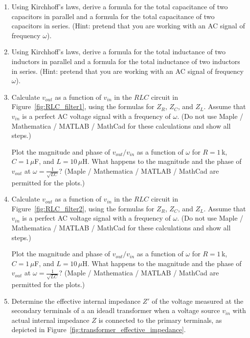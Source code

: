 \documentclass{article}
\begin{document}
\begin{enumerate}
\item Using Kirchhoff's laws, derive a formula for the total capacitance of two capacitors in parallel and a formula for the total capacitance of two capacitors in series. (Hint: pretend that you are working with an AC signal of frequency $\omega$).
\item Using Kirchhoff's laws, derive a formula for the total inductance of two inductors in parallel and a formula for the total inductance of two inductors in series. (Hint: pretend that you are working with an AC signal of frequency $\omega$).
\item Calculate $v_{out}$ as a function of $v_{in}$ in the $RLC$ circuit in Figure~\ref{fig:RLC_filter1}, using the formulas for $Z_R$, $Z_C$, and $Z_L$. Assume that $v_{in}$ is a perfect AC voltage signal with a frequency of $\omega$.  (Do not use Maple / Mathematica / MATLAB / MathCad for these calculations and show all steps.)

Plot the magnitude and phase\footnotemark{} of $v_{out}/v_{in}$ as a function of $\omega$ for $R = 1$\,k\Ohm, $C = 1$\,$\mu$F, and $L = 10$\,$\mu$H. What happens to the magnitude and the phase of $v_{out}$ at $\omega = \frac{1}{\sqrt{LC}}$?  (Maple / Mathematica / MATLAB / MathCad are permitted for the
plots.)


\item Calculate $v_{out}$ as a function of $v_{in}$ in the $RLC$ circuit in Figure~\ref{fig:RLC_filter2}, using the formulas for $Z_R$, $Z_C$, and $Z_L$. Assume that $v_{in}$ is a perfect AC voltage signal with a frequency of $\omega$.  (Do not use Maple / Mathematica / MATLAB / MathCad for these calculations and show all steps.)

Plot the magnitude and phase of $v_{out}/v_{in}$ as a function of $\omega$ for $R = 1$\,k\Ohm, $C = 1$\,$\mu$F, and $L = 10$\,$\mu$H. What happens to the magnitude and the phase of $v_{out}$ at $\omega = \frac{1}{\sqrt{LC}}$?  (Maple / Mathematica / MATLAB / MathCad are permitted for the plots.)

\item Determine the effective internal impedance $Z'$ of the voltage measured at the secondary terminals of a an ideadl transformer when a voltage source $v_{in}$ with actual internal impedance $Z$ is connected to the primary terminals, as depicted in Figure~\ref{fig:transformer_effective_impedance}.
\label{ex:transformer}
\end{enumerate}
\end{document}
